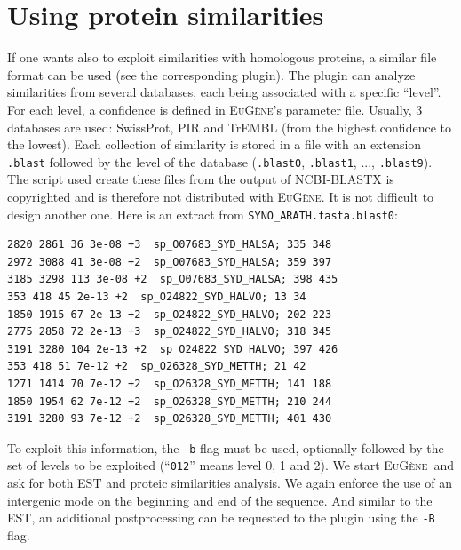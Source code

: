 \documentclass[a4paper,titlepage]{report}
\newcommand{\EuGene}{\textsc{EuG\`ene}}
\begin{document}
\section{Using protein similarities}

If one wants also to exploit similarities with homologous proteins, a
similar file format can be used (see the corresponding plugin). The
plugin can analyze similarities from several databases, each being
associated with a specific ``level''. For each level, a confidence is
defined in \EuGene's parameter file. Usually, 3 databases are used:
SwissProt, PIR and TrEMBL (from the highest confidence to the
lowest). Each collection of similarity is stored in a file with an
extension \texttt{.blast} followed by the level of the database 
(\texttt{.blast0}, \texttt{.blast1}, ..., \texttt{.blast9}).  The
script used create these files from the output of NCBI-BLASTX is
copyrighted and is therefore not distributed with \EuGene. It is not
difficult to design another one. Here is an extract from
\texttt{SYNO\_ARATH.fasta.blast0}:

\begin{Verbatim}[fontsize=\scriptsize]
2820 2861 36 3e-08 +3  sp_O07683_SYD_HALSA; 335 348
2972 3088 41 3e-08 +2  sp_O07683_SYD_HALSA; 359 397
3185 3298 113 3e-08 +2  sp_O07683_SYD_HALSA; 398 435
353 418 45 2e-13 +2  sp_O24822_SYD_HALVO; 13 34
1850 1915 67 2e-13 +2  sp_O24822_SYD_HALVO; 202 223
2775 2858 72 2e-13 +3  sp_O24822_SYD_HALVO; 318 345
3191 3280 104 2e-13 +2  sp_O24822_SYD_HALVO; 397 426
353 418 51 7e-12 +2  sp_O26328_SYD_METTH; 21 42
1271 1414 70 7e-12 +2  sp_O26328_SYD_METTH; 141 188
1850 1954 62 7e-12 +2  sp_O26328_SYD_METTH; 210 244
3191 3280 93 7e-12 +2  sp_O26328_SYD_METTH; 401 430
\end{Verbatim}

To exploit this information, the \texttt{-b} flag must be used,
optionally followed by the set of levels to be exploited
(``\texttt{012}'' means level 0, 1 and 2).  We start \EuGene\ and ask
for both EST and proteic similarities analysis. We again enforce the
use of an intergenic mode on the beginning and end of the sequence.
And similar to the EST, an additional postprocessing can be requested
to the plugin using the \texttt{-B} flag.
\end{document}
